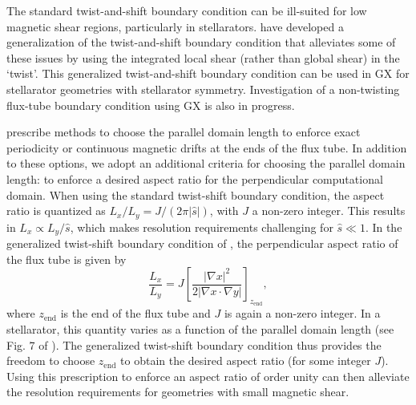\documentclass{jpp}
\begin{document}
The standard twist-and-shift boundary condition can be ill-suited for low magnetic shear regions, particularly in stellarators. \citet{Martin2018} have developed a generalization of the twist-and-shift boundary condition that alleviates some of these issues by using the integrated local shear (rather than global shear) in the `twist'. {\color{black} This generalized twist-and-shift boundary condition can be used in GX for stellarator geometries with stellarator symmetry}. Investigation of a non-twisting flux-tube boundary condition \citep{Ball2021} using GX is also in progress. 

{\color{black}
\citet{Martin2018} prescribe methods to choose the parallel domain length to enforce exact periodicity or continuous magnetic drifts at the ends of the flux tube. In addition to these options, we adopt an additional criteria for choosing the parallel domain length: to enforce a desired aspect ratio for the perpendicular computational domain. When using the standard twist-shift boundary condition, the aspect ratio is quantized as $L_x/L_y = J/(2\pi|\hat{s}|)$, with $J$ a non-zero integer. This results in $L_x \propto L_y/\hat{s}$, which makes resolution requirements challenging for $\hat{s}\ll 1$. In the generalized twist-shift boundary condition of \citet{Martin2018}, the perpendicular aspect ratio of the flux tube is given by
\begin{equation}
    \frac{L_x}{L_y} = J\left[\frac{|\nabla x|^2}{2|\nabla x\cdot \nabla y|}\right]_{z_\mathrm{end}},
\end{equation}
where $z_\mathrm{end}$ is the end of the flux tube and $J$ is again a non-zero integer. In a stellarator, this quantity varies as a function of the parallel domain length (see Fig. 7 of \citep{Martin2018}). 
The generalized twist-shift boundary condition thus provides the freedom to choose $z_\mathrm{end}$ to obtain the desired aspect ratio (for some integer $J$). Using this prescription to enforce an aspect ratio of order unity can then alleviate the resolution requirements for geometries with small magnetic shear.
}

%
%
%
\end{document}
